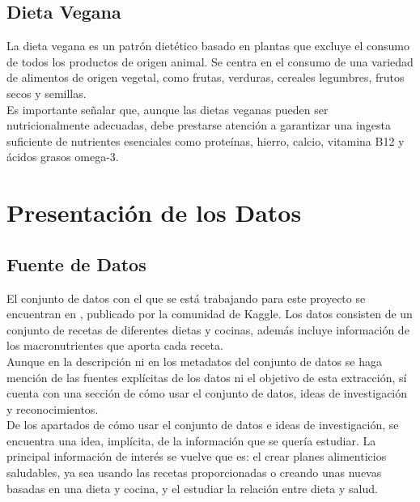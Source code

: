 \documentclass[12pt,a4paper]{article}
\begin{document}
    \subsection{Dieta Vegana}

        \cite{marvastipopular} La dieta vegana es un patrón dietético basado en 
        plantas que excluye el consumo de todos los productos de origen animal. Se 
        centra en el consumo de una variedad de alimentos de origen vegetal, como 
        frutas, verduras, cereales legumbres, frutos secos y semillas.\\

        Es importante señalar que, aunque las dietas veganas pueden ser 
        nutricionalmente adecuadas, debe prestarse atención a garantizar una 
        ingesta suficiente de nutrientes esenciales como proteínas, hierro, 
        calcio, vitamina B12 y ácidos grasos omega-3.

\newpage

\section{Presentación de los Datos}

    \subsection{Fuente de Datos}

        El conjunto de datos con el que se está trabajando para este proyecto 
        se encuentran en \cite{dataset_macronutrients}, publicado por la comunidad 
        de Kaggle. Los datos consisten de un conjunto de recetas de diferentes 
        dietas y cocinas, además incluye información de los macronutrientes que 
        aporta cada receta.\\

        \cite{dataset_macronutrients} Aunque en la descripción ni en los metadatos del conjunto de datos se 
        haga mención de las fuentes explícitas de los datos ni el objetivo de 
        esta extracción, sí cuenta con una sección de cómo usar el conjunto de 
        datos, ideas de investigación y reconocimientos.\\

        De los apartados de cómo usar el conjunto de datos e ideas de investigación, 
        se encuentra una idea, implícita, de la información que se quería estudiar. 
        La principal información de interés se vuelve que es: el crear planes 
        alimenticios saludables, ya sea usando las recetas proporcionadas o creando 
        unas nuevas basadas en una dieta y cocina, y el estudiar la relación entre 
        dieta y salud.\\
\end{document}

